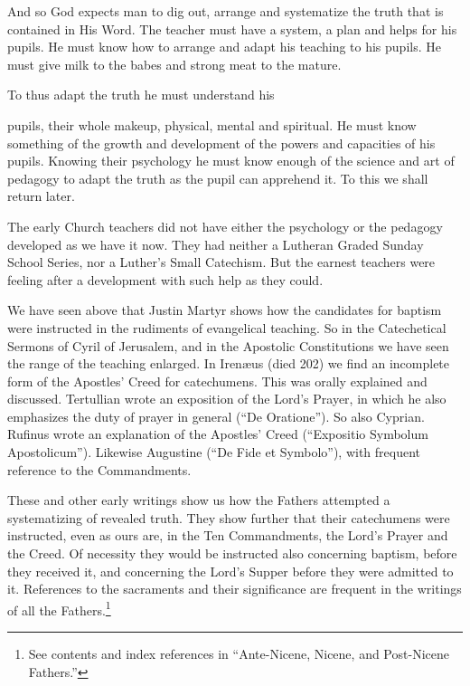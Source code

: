 And so God expects man to dig out, arrange and systematize the truth that is contained in His Word.  The teacher must have a system, a plan and helps for his pupils. He must know how to arrange and adapt his teaching to his pupils. He must give milk to the babes and strong meat to the mature.


To thus adapt the truth he must understand his

pupils, their whole makeup, physical, mental and spiritual. He must know something of the growth and development of the powers and capacities of his pupils. Knowing their psychology he must know enough of the science and art of pedagogy to adapt the truth as the pupil can apprehend it. To this we shall return later.

The early Church teachers did not have either the psychology or the pedagogy developed as we have it now. They had neither a Lutheran Graded Sunday School Series, nor a Luther’s Small Catechism. But the earnest teachers were feeling after a development with such help as they could. 

We have seen above that Justin Martyr shows how the candidates for baptism were instructed in the rudiments of evangelical teaching. So in the Catechetical Sermons of Cyril of Jerusalem, and in the Apostolic Constitutions we have seen the range of the teaching enlarged. In Irenæus (died 202) we find an incomplete form of the Apostles’ Creed for catechumens. This was orally explained and discussed. Tertullian wrote an exposition of the Lord’s Prayer, in which he also emphasizes the duty of prayer in general (“De Oratione”). So also Cyprian. Rufinus wrote an explanation of the Apostles’ Creed (“Expositio Symbolum Apostolicum”). Likewise Augustine (“De Fide et Symbolo”), with frequent reference to the Commandments.

These and other early writings show us how the Fathers attempted a systematizing of revealed truth. They show further that their catechumens were instructed, even as ours are, in the Ten Commandments, the Lord’s Prayer and the Creed. Of necessity they would be instructed also concerning baptism, before they received it, and concerning the Lord’s Supper before they were admitted to it. References to the sacraments and their significance are frequent in the writings of all the Fathers.\footnote{See contents and index references in “Ante-Nicene, Nicene, and Post-Nicene Fathers.”}

